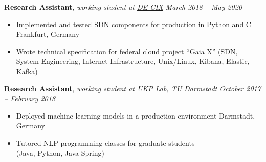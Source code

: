 \documentclass[9pt]{extarticle}
\begin{document}
\noindent
{\bf Research Assistant}, \textit{working student at \href{https://www.de-cix.net/}{DE-CIX}}   \hfill \textit{March 2018 -- May 2020}
\begin{itemize}
\setlength\itemsep{0.05em}
\item Implemented and tested SDN components for production in Python and C \hfill Frankfurt, Germany
\item Wrote technical specification for federal cloud project “Gaia X”
(SDN, System Engineering, Internet Infrastructure, Unix/Linux, Kibana, Elastic, Kafka) \\
\end{itemize}

\noindent
{\bf Research Assistant}, \textit{working student at \href{https://www.informatik.tu-darmstadt.de/ukp/ukp_home/index.en.jsp}{UKP Lab, TU Darmstadt}}  \hfill \textit{October 2017 -- February 2018}
\begin{itemize}
\setlength\itemsep{0.05em}
    \item Deployed machine learning models in a production environment \hfill Darmstadt, Germany
    \item Tutored NLP programming classes for graduate students \\
    (Java, Python, Java Spring) \\
\end{itemize}
\end{document}
